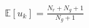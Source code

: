 \documentclass[preview]{standalone}
\begin{document}
\begin{align*}
\mathbb{E}[u_k] = \frac{N_r+N_g+1}{N_g+1}
\end{align*}
\end{document}
